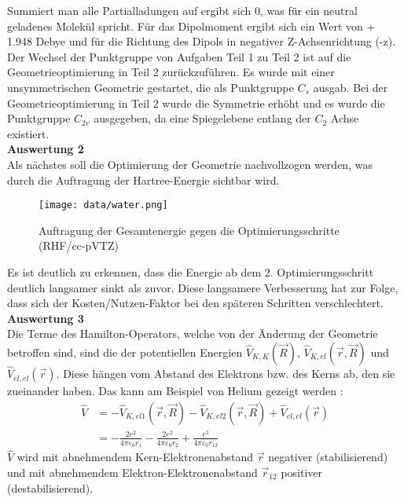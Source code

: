 \documentclass[12pt]{article}
\begin{document}
\begin{onehalfspace}
\begin{table}[htbp]
\begin{tabular}{lr}
\end{tabular}
\end{table}
\noindent
Summiert man alle Partialladungen auf ergibt sich 0, was für ein neutral geladenes Molekül spricht.
Für das Dipolmoment ergibt sich ein Wert von + 1.948 Debye und für die Richtung des Dipols in negativer Z-Achsenrichtung (-z).
Der Wechsel der Punktgruppe von Aufgaben Teil 1 zu Teil 2 ist auf die Geometrieoptimierung in Teil 2 zurückzuführen.
 Es wurde mit einer unsymmetrischen Geometrie gestartet, die als Punktgruppe $C _s$ ausgab.
  Bei der Geometrieoptimierung in Teil 2 wurde die Symmetrie erhöht und es wurde die Punktgruppe $C _{2v}$ ausgegeben,
  da eine Spiegelebene entlang der $C _2$ Achse existiert.\\
\noindent
\textbf{Auswertung 2}\\
Als nächstes soll die Optimierung der Geometrie nachvollzogen werden, was durch die Auftragung der Hartree-Energie sichtbar wird.
\begin{figure}[!htp]
\centering
  \texttt{[image: data/water.png]}%
  \caption{Auftragung der Gesamtenergie gegen die Optimierungsschritte (RHF/cc-pVTZ)}
\end{figure}
Es ist deutlich zu erkennen, dass die Energie ab dem 2. Optimierungsschritt deutlich langsamer sinkt als zuvor. Diese langsamere Verbesserung hat zur Folge, dass sich der Kosten/Nutzen-Faktor bei den späteren Schritten verschlechtert.\\
\newpage
\noindent
\textbf{Auswertung 3}\\
Die Terme des Hamilton-Operators, welche von der Änderung der Geometrie betroffen sind, sind die der potentiellen Energien
$\hat{V} _{K,K}(\vec{R})$, $\hat{V} _{K,el}(\vec{r},\vec{R})$ und $\hat{V} _{el,el}(\vec{r})$.
Diese hängen vom Abstand des Elektrons bzw. des Kerns ab, den sie zueinander haben. Das kann am Beispiel von Helium gezeigt werden \supercite{atkins219}:\\
\begin{align*}
\hat{V} &= - \hat{V} _{K,el1}(\vec{r},\vec{R}) - \hat{V} _{K,el2}(\vec{r},\vec{R})  + \hat{V} _{el,el}(\vec{r}) \\
  &= - \frac{2e^2}{4\pi \varepsilon _0 r _1} - \frac{2e^2}{4\pi \varepsilon _0 r _2} +  \frac{e^2}{4\pi \varepsilon _0 r _{12}}
\end{align*}
$\hat{V}$ wird mit abnehmendem Kern-Elektronenabstand $\vec{r}$ negativer (stabilisierend) und mit abnehmendem Elektron-Elektronenabstand $\vec{r} _{12}$ positiver (destabilisierend).


\end{onehalfspace}
\end{document}
